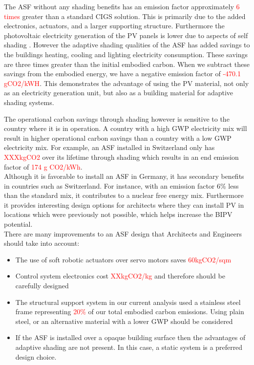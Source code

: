 
The ASF without any shading benefits has an emission factor approximately \textcolor{red}{6 times } greater than a standard CIGS solution. This is primarily due to the added electronics, actuators, and a larger supporting structure. Furthermore the photovoltaic electricity generation of the PV panels is lower due to aspects of self shading \cite{hofer2015photovoltaics}. However the adaptive shading qualities of the ASF has added savings to the buildings heating, cooling and lighting electricity consumption. These savings are three times greater than the initial embodied carbon. When we subtract these savings from the embodied energy, we have a negative emission factor of \textcolor{red}{-470.1 gCO2/kWH}. This demonstrates the advantage of using the PV material, not only as an electricity generation unit, but also as a building material for adaptive shading systems.


The operational carbon savings through shading however is sensitive to the country where it is in operation. A country with a high GWP electricity mix will result in higher operational carbon savings than a country with a low GWP electricity mix. For example, an ASF installed in Switzerland only has \textcolor{red}{XXXkgCO2} over its lifetime through shading which results in an end emission factor of \textcolor{red}{174 g CO2/kWh}. \\

Although it is favorable to install an ASF in Germany, it has secondary benefits in countries such as Switzerland. For instance, with an emission factor 6\% less than the standard mix, it contributes to a nuclear free energy mix. Furthermore it provides interesting design options for architects where they can install PV in locations which were previously not possible, which helps increase the BIPV potential.  \\

There are many improvements to an ASF design that Architects and Engineers should take into account: 
\begin{itemize}
\item The use of soft robotic actuators over servo motors saves \textcolor{red}{60kgCO2/sqm}
\item Control system electronics cost \textcolor{red}{XXkgCO2/kg} and therefore should be carefully designed
\item The structural support system in our current analysis used a stainless steel frame representing \textcolor{red}{20\%} of our total embodied carbon emissions. Using plain steel, or an alternative material with a lower GWP should be considered
\item If the ASF is installed over a opaque building surface then the advantages of adaptive shading are not present. In this case, a static system is a preferred design choice. 
\end{itemize}

